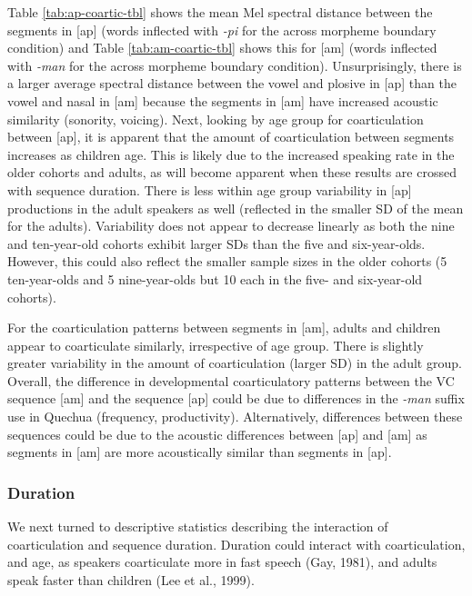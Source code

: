 \documentclass[
]{article}
\begin{document}
Table \ref{tab:ap-coartic-tbl} shows the mean Mel spectral distance between the segments in {[}ap{]} (words inflected with \emph{-pi} for the across morpheme boundary condition) and Table \ref{tab:am-coartic-tbl} shows this for {[}am{]} (words inflected with \emph{-man} for the across morpheme boundary condition). Unsurprisingly, there is a larger average spectral distance between the vowel and plosive in {[}ap{]} than the vowel and nasal in {[}am{]} because the segments in {[}am{]} have increased acoustic similarity (sonority, voicing). Next, looking by age group for coarticulation between {[}ap{]}, it is apparent that the amount of coarticulation between segments increases as children age. This is likely due to the increased speaking rate in the older cohorts and adults, as will become apparent when these results are crossed with sequence duration. There is less within age group variability in {[}ap{]} productions in the adult speakers as well (reflected in the smaller SD of the mean for the adults). Variability does not appear to decrease linearly as both the nine and ten-year-old cohorts exhibit larger SDs than the five and six-year-olds. However, this could also reflect the smaller sample sizes in the older cohorts (5 ten-year-olds and 5 nine-year-olds but 10 each in the five- and six-year-old cohorts).

For the coarticulation patterns between segments in {[}am{]}, adults and children appear to coarticulate similarly, irrespective of age group. There is slightly greater variability in the amount of coarticulation (larger SD) in the adult group. Overall, the difference in developmental coarticulatory patterns between the VC sequence {[}am{]} and the sequence {[}ap{]} could be due to differences in the \emph{-man} suffix use in Quechua (frequency, productivity). Alternatively, differences between these sequences could be due to the acoustic differences between {[}ap{]} and {[}am{]} as segments in {[}am{]} are more acoustically similar than segments in {[}ap{]}.

\hypertarget{duration}{%
\subsubsection{Duration}\label{duration}}

We next turned to descriptive statistics describing the interaction of coarticulation and sequence duration. Duration could interact with coarticulation, and age, as speakers coarticulate more in fast speech (Gay, 1981), and adults speak faster than children (Lee et al., 1999).
\end{document}
